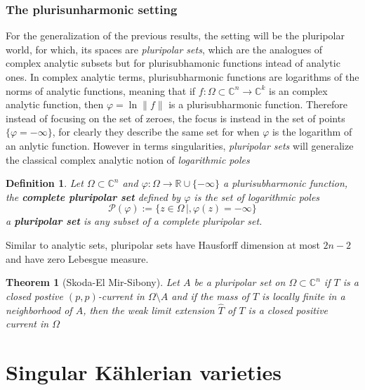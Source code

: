 \documentclass[12pt,twoside,a4paper]{report}
\newtheorem{definition}{Definition}[section]
\newtheorem{theorem}{Theorem}[section]
\newcommand{\re}{\ensuremath{\mathbb R }}
\newcommand{\co}{\ensuremath{\mathbb C }}
\newcommand{\con}{\ensuremath{\mathbb{C}^n}}
\newcommand{\om}{\ensuremath{\Omega}}
\newcommand{\psheaf}{\ensuremath{\mathcal P }}
\begin{document}
\subsection{The plurisunharmonic setting}
For the generalization of the previous results, the setting will be the pluripolar world, for which, its spaces are \emph{pluripolar sets}, which are the analogues of complex analytic subsets but for plurisubhamonic functions intead of analytic ones. In complex analytic terms, plurisubharmonic functions are logarithms of the norms of analytic functions, meaning that if $f:\om\subset\con\to\co^k$ is an complex analytic function, then $\varphi=\ln\|f\|$ is a plurisubharmonic function. Therefore instead of focusing on the set of zeroes, the focus is instead in the set of points  $\{\varphi=-\infty\}$, for clearly they describe the same set for when $\varphi$ is the logarithm of an anlytic function. However in terms singularities, \emph{pluripolar sets} will generalize the classical complex analytic notion of \emph{logarithmic poles}      
\begin{definition}
  Let $\om\subset\con$ and $\varphi:\om\to\re\cup\{-\infty\}$ a plurisubharmonic function, the {\bf complete pluripolar set} defined by $\varphi$ is the set of logarithmic poles
  \[
    \psheaf(\varphi):=\{z\in\om\,|,\varphi(z)=-\infty\}
  \]
  a {\bf pluripolar set} is any subset of a complete pluripolar set. 
  \end{definition}
  Similar to analytic sets, pluripolar sets have Hausforff dimension at most $2n-2$ and have zero Lebesgue measure.
  \begin{theorem}[Skoda-El Mir-Sibony]
    Let $A$ be a pluripolar set on $\om\subset\con$ if $T$ is a closed postive $(p,p)$-current in $\om\setminus A$ and if the mass of $T$ is locally finite in a neighborhood of $A$, then the weak limit extension $\hat{T}$ of $T$ is a closed positive current in $\om$
    \end{theorem}
\chapter{Singular Kählerian varieties}
\pagestyle{fancy}
\fancyhf{}
\fancyhead[LE]{\rightmark}
\fancyhead[RO]{\leftmark}
\fancyfoot[C]{\thepage}
\end{document}

